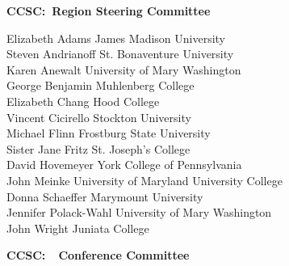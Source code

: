 \documentclass{article}
\begin{document}
\begingroup
  \centering
  \textbf{\large CCSC:\confName\ Region Steering Committee}\\
\endgroup

\vspace{10pt}

{\parindent0pt
Elizabeth Adams \dotfill James Madison University\\
Steven Andrianoff \dotfill St. Bonaventure University\\
Karen Anewalt \dotfill University of Mary Washington\\
George Benjamin \dotfill Muhlenberg College\\
Elizabeth Chang \dotfill Hood College\\
Vincent Cicirello \dotfill Stockton University\\
Michael Flinn \dotfill Frostburg State University\\
Sister Jane Fritz \dotfill St. Joseph's College\\
David Hovemeyer \dotfill York College of Pennsylvania\\
John Meinke \dotfill University of Maryland University College\\
Donna Schaeffer \dotfill Marymount University\\
Jennifer Polack-Wahl \dotfill University of Mary Washington\\
John Wright \dotfill Juniata College\\
}

\vspace{10pt}
\vspace{10pt}

\begingroup
  \centering
  \textbf{\large CCSC:\confName\ \confYear\ Conference Committee}\\
\endgroup

\vspace{10pt}
\end{document}
